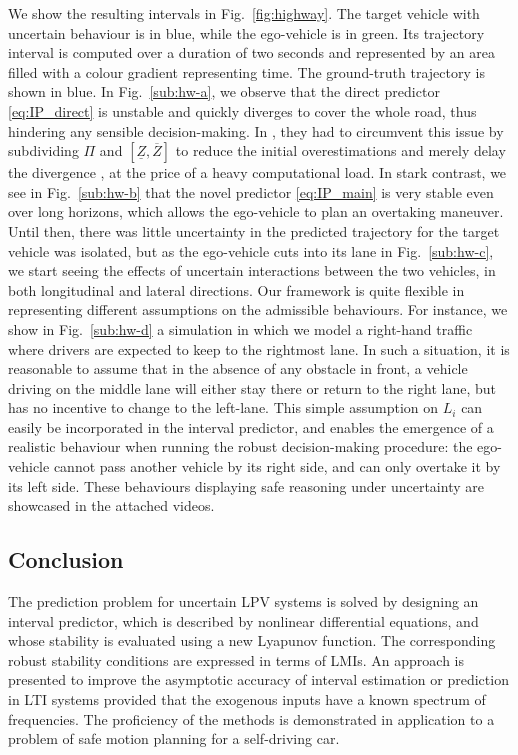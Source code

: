 We show the resulting intervals in Fig.~\ref{fig:highway}. The target vehicle with uncertain behaviour is in blue, while the ego-vehicle is in green. Its trajectory interval is computed over a duration of two seconds and represented by an area filled with a colour gradient representing time. The ground-truth trajectory is shown in blue. In Fig.~\ref{sub:hw-a}, we observe that the direct predictor \eqref{eq:IP_direct} is unstable and quickly diverges to cover the whole road, thus hindering any sensible decision-making. In \cite{Leurent2018}, they had to circumvent this issue by subdividing $\Pi$ and $[\underline{Z}, \overline{Z}]$ to reduce the initial overestimations and merely delay the divergence \cite{Adrot2003}, at the price of a heavy computational load. In stark contrast, we see in Fig.~\ref{sub:hw-b} that the novel predictor \eqref{eq:IP_main} is very stable even over long horizons, which allows the ego-vehicle to plan an overtaking maneuver. Until then, there was little uncertainty in the predicted trajectory for the target vehicle was isolated, but as the ego-vehicle cuts into its lane in Fig.~\ref{sub:hw-c}, we start seeing the  effects of uncertain interactions between the two vehicles, in both longitudinal and lateral directions. Our framework is quite flexible in representing different assumptions on the admissible behaviours. For instance, we show in Fig.~\ref{sub:hw-d} a simulation in which we model a right-hand traffic where drivers are expected to keep to the rightmost lane. In such a situation, it is reasonable to assume that in the absence of any obstacle in front, a vehicle driving on the middle lane will either stay there or return to the right lane, but has no incentive to change to the left-lane. This simple assumption on $L_i$ can easily be incorporated in the interval predictor, and enables the emergence of a realistic behaviour when running the robust decision-making procedure: the ego-vehicle cannot pass another vehicle by its right side, and can only overtake it by its left side. These behaviours displaying safe reasoning under uncertainty are showcased in the attached videos.

\subsection*{Conclusion}

The prediction problem for uncertain LPV systems is solved by designing an interval predictor, which is described by nonlinear differential equations, and whose stability is evaluated using a new Lyapunov function. The corresponding robust stability conditions are expressed in terms of LMIs. An approach is presented to improve the asymptotic accuracy of interval estimation or prediction in LTI systems provided that the exogenous inputs have a known spectrum of frequencies. The proficiency of the methods is demonstrated in application to a problem of safe motion planning for a self-driving car.



